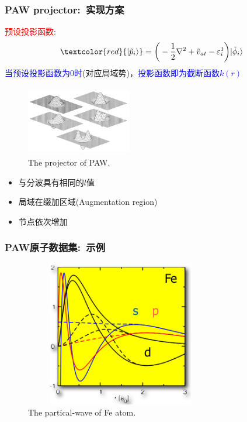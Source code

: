 {\frame
{
	\frametitle{\textrm{PAW projector}:~实现方案}
	\textcolor{red}{预设投影函数}:$$\textcolor{red}{|\tilde p_i\rangle}=\bigg(-\dfrac12\nabla^2+\tilde v_{at}-\varepsilon_i^1\bigg)|\tilde\phi_i\rangle$$
	\textcolor{blue}{当预设投影函数为0时}(对应局域势)，\textcolor{blue}{投影函数即为截断函数$k(r)$}
\begin{minipage}[t]{0.52\linewidth}
\begin{figure}[h!]
\centering
\vspace*{-0.30in}
\includegraphics[height=1.2in,width=1.8in,viewport=0 0 1100 745,clip]{Figures/PAW_projector-2.png}
\caption{\tiny \textrm{The projector of PAW.}}%
\label{PAW_projector}
\end{figure}
\end{minipage}
\hfill
\begin{minipage}[t]{0.43\linewidth}
\begin{itemize}
	\item 与分波具有相同的$l$值
	\item 局域在缀加区域(\textrm{Augmentation region})
	\item 节点依次增加
\end{itemize}
\end{minipage}
	\fontsize{7.2pt}{5.2pt}
}

\frame
{
	\frametitle{\textrm{PAW}原子数据集:~示例}
\begin{figure}[h!]
\centering
\includegraphics[height=2.5in,width=3.3in,viewport=0 0 570 545,clip]{Figures/PAW-partical.png}
\caption{\tiny \textrm{The partical-wave of Fe atom.}}%
\label{PAW_partical_Fe}
\end{figure}
}

}

